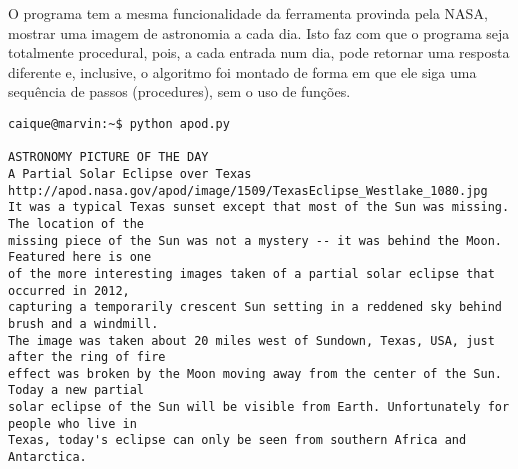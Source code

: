 \documentclass{article}
\begin{document}
\sloppy
O programa tem a mesma funcionalidade da ferramenta provinda pela NASA, mostrar uma imagem de astronomia a cada dia. Isto faz com que o programa seja totalmente procedural, pois, a cada entrada num dia, pode retornar uma resposta diferente e, inclusive, o algoritmo foi montado de forma em que ele siga uma sequência de passos (procedures), sem o uso de funções.

\begin{verbatim}
caique@marvin:~$ python apod.py 

ASTRONOMY PICTURE OF THE DAY
A Partial Solar Eclipse over Texas
http://apod.nasa.gov/apod/image/1509/TexasEclipse_Westlake_1080.jpg
It was a typical Texas sunset except that most of the Sun was missing. The location of the
missing piece of the Sun was not a mystery -- it was behind the Moon. Featured here is one 
of the more interesting images taken of a partial solar eclipse that occurred in 2012, 
capturing a temporarily crescent Sun setting in a reddened sky behind brush and a windmill.
The image was taken about 20 miles west of Sundown, Texas, USA, just after the ring of fire 
effect was broken by the Moon moving away from the center of the Sun. Today a new partial 
solar eclipse of the Sun will be visible from Earth. Unfortunately for people who live in
Texas, today's eclipse can only be seen from southern Africa and Antarctica.
\end{verbatim}
\end{document}
